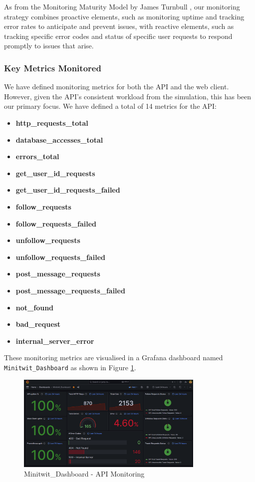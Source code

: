 As from the Monitoring Maturity Model by James Turnbull \cite{MonitoringMaturityModel}, our monitoring strategy combines proactive elements, such as monitoring uptime and tracking error rates to anticipate and prevent issues, with reactive elements, such as tracking specific error codes and status of specific user requests to respond promptly to issues that arise.


\subsubsection*{Key Metrics Monitored}
We have defined monitoring metrics for both the API and the web client. However, given the API's consistent workload from the simulation, this has been our primary focus. We have defined a total of 14 metrics for the API:
\begin{multicols}{2}
\begin{itemize}
    \item \textbf{http\_requests\_total}
    \item \textbf{database\_accesses\_total}
    \item \textbf{errors\_total}
    \item \textbf{get\_user\_id\_requests}
    \item \textbf{get\_user\_id\_requests\_failed}
    \item \textbf{follow\_requests}
    \item \textbf{follow\_requests\_failed}
    \item \textbf{unfollow\_requests}
    \item \textbf{unfollow\_requests\_failed}
    \item \textbf{post\_message\_requests}
    \item \textbf{post\_message\_requests\_failed}
    \item \textbf{not\_found}
    \item \textbf{bad\_request}
    \item \textbf{internal\_server\_error}
\end{itemize}
\end{multicols}

These monitoring metrics are visualised in a Grafana dashboard named \texttt{Minitwit\_Dashboard} as shown in Figure \ref{fig:monitor_good}. 

\begin{figure}[H]
    \centering
    \includegraphics[width=0.8\textwidth]{images/monitor_good.png}
    \caption{Minitwit\_Dashboard - API Monitoring}
    \label{fig:monitor_good}
\end{figure}

